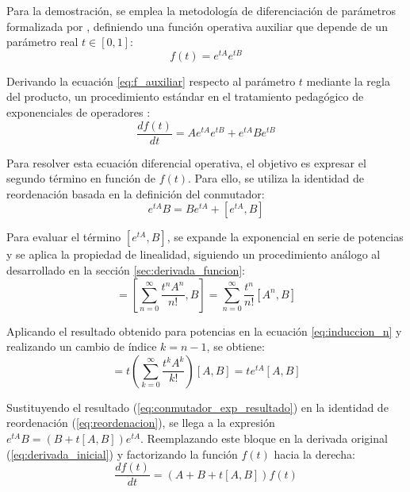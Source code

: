 \documentclass[11pt,a4paper,spanish]{book}
\begin{document}
Para la demostración, se emplea la metodología de diferenciación de parámetros formalizada por \cite{wilcox1967}, definiendo una función operativa auxiliar que depende de un parámetro real $t \in [0, 1]$:
\begin{equation}
f(t) = e^{tA} e^{tB} \label{eq:f_auxiliar}
\end{equation}

Derivando la ecuación \ref{eq:f_auxiliar} respecto al parámetro $t$ mediante la regla del producto, un procedimiento estándar en el tratamiento pedagógico de exponenciales de operadores \citep{messiah1961}:
\begin{equation}
\frac{df(t)}{dt} = A e^{tA} e^{tB} + e^{tA} B e^{tB} \label{eq:derivada_inicial}
\end{equation}

Para resolver esta ecuación diferencial operativa, el objetivo es expresar el segundo término en función de $f(t)$. Para ello, se utiliza la identidad de reordenación basada en la definición del conmutador:
\begin{equation}
e^{tA}B = B e^{tA} + [e^{tA}, B] \label{eq:reordenacion}
\end{equation}

Para evaluar el término $[e^{tA}, B]$, se expande la exponencial en serie de potencias y se aplica la propiedad de linealidad, siguiendo un procedimiento análogo al desarrollado en la sección \ref{sec:derivada_funcion}:
\begin{equation}
[e^{tA}, B] = \left[ \sum_{n=0}^{\infty} \frac{t^n A^n}{n!}, B \right] = \sum_{n=0}^{\infty} \frac{t^n}{n!} [A^n, B]
\end{equation}

Aplicando el resultado obtenido para potencias en la ecuación \ref{eq:induccion_n} y realizando un cambio de índice $k = n-1$, se obtiene:
\begin{equation}
[e^{tA}, B] = t \left( \sum_{k=0}^{\infty} \frac{t^k A^k}{k!} \right) [A, B] = t e^{tA} [A, B] \label{eq:conmutador_exp_resultado}
\end{equation}

Sustituyendo el resultado (\ref{eq:conmutador_exp_resultado}) en la identidad de reordenación (\ref{eq:reordenacion}), se llega a la expresión $e^{tA}B = (B + t[A, B])e^{tA}$. Reemplazando este bloque en la derivada original (\ref{eq:derivada_inicial}) y factorizando la función $f(t)$ hacia la derecha:
\begin{equation}
\frac{df(t)}{dt} = (A + B + t[A, B]) f(t) \label{eq:edo_operativa}
\end{equation}
\end{document}
